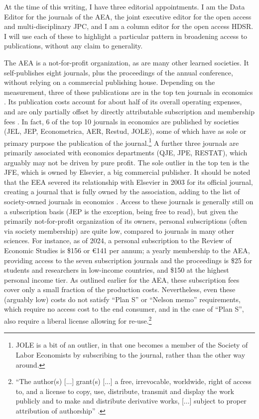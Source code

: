 \documentclass{article}
\begin{document}
{At the time of this writing, I have three editorial appointments. I am the Data Editor for the journals of the \acf{AEA}, the joint executive editor for the open access and multi-disciplinary \ac{JPC}, and I am a column editor for the open access \ac{HDSR}. I will use each of these to highlight a particular pattern in broadening access to publications, without any claim to generality. 

The \ac{AEA} is a not-for-profit organization, as are many other learned societies. It self-publishes eight journals, plus the proceedings of the annual conference, without relying on a commercial publishing house. Depending on the measurement, three of these publications are in the top ten journals in economics \citep{mogstad_statistical_2022-1}. Its publication costs account for about half of its overall operating expenses, and are only partially offset by directly attributable subscription and membership fees \citep{cherry_bekaert_llp_american_2024}. In fact, 6 of the top 10 journals in economics \citep{mogstad_statistical_2022-1} are published by societies (JEL, JEP, Econometrica, AER, Restud, JOLE), some of which have as sole or primary purpose the publication of the journal.\footnote{JOLE is a bit of an outlier, in that one becomes a member of the Society of Labor Economists by subscribing to the journal, rather than the other way around.} A further three journals are primarily associated with economics departments (QJE, JPE, RESTAT), which arguably may not be driven by pure profit. The sole outlier in the top ten is the \ac{JFE}, which is owned by Elsevier, a big commercial publisher. It should be noted that the \ac{EEA} severed its relationship with Elsevier in 2003 for its official journal, creating a journal that is fully owned by the association, adding to the list of society-owned journals in economics \citep{tirole_editorial_2003}. Access to these journals is generally still on a subscription basis (JEP is the exception, being free to read), but given the primarily not-for-profit organization of its owners, personal subscriptions (often via society membership) are quite low, compared to journals in many other sciences. For instance, as of 2024, a personal subscription to the Review of Economic Studies is \$156 or €141 per annum; a yearly membership to the \ac{AEA}, providing access to the seven subscription journals and the proceedings is \$25 for students and researchers in low-income countries, and \$150 at the highest personal income tier. As outlined earlier for the AEA, these subscription fees cover only a small fraction of the production costs. Nevertheless, even these (arguably low) costs do not satisfy ``Plan S'' or ``Nelson memo'' requirements, which require no access cost to the end consumer, and in the case of ``Plan S'', also require a liberal license allowing for re-use.\footnote{``The author(s) [...] grant(s) [...] a free, irrevocable, worldwide, right of access to, and a license to copy, use, distribute, transmit and display the work publicly and to make and distribute derivative works, [...] subject to proper attribution of authorship'' \citep{max-planck-gesellschaft_berlin_2023}. }

}
\end{document}
